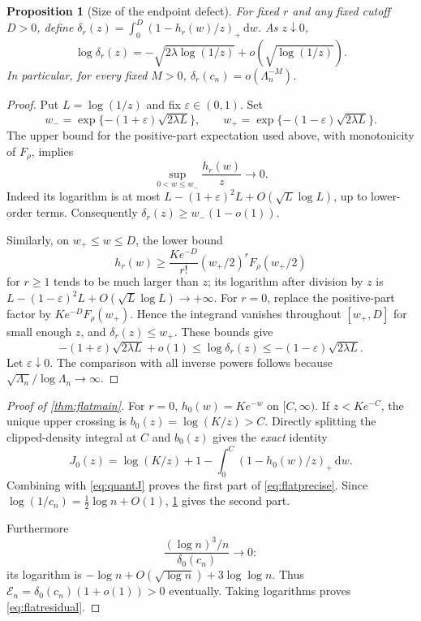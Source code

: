 \documentclass[11pt,oneside]{article}
\numberwithin{equation}{section}
\theoremstyle{plain}
\newtheorem{proposition}[theorem]{Proposition}
\theoremstyle{definition}
\theoremstyle{remark}
\newcommand{\dd}{\,\mathrm d}
\newcommand{\eps}{\varepsilon}
\begin{document}
\begin{proposition}[Size of the endpoint defect]\label{prop:defect}
For fixed $r$ and any fixed cutoff $D>0$, define
$\delta_r(z)=\int_0^D(1-h_r(w)/z)_+\dd w$. As $z\downarrow0$,
\begin{equation}\label{eq:deltasize}
 \log\delta_r(z)=-\sqrt{2\lambda\log(1/z)}
                    +o\!\left(\sqrt{\log(1/z)}\right).
\end{equation}
In particular, for every fixed $M>0$,
$\delta_r(c_n)=o(\Lambda_n^{-M})$.
\end{proposition}
\begin{proof}
Put $L=\log(1/z)$ and fix $\eps\in(0,1)$. Set
\[
 w_-=\exp\{-(1+\eps)\sqrt{2\lambda L}\},\qquad
 w_+=\exp\{-(1-\eps)\sqrt{2\lambda L}\}.
\]
The upper bound for the positive-part expectation used above,
with monotonicity of $F_\rho$, implies
\[
 \sup_{0<w\le w_-}\frac{h_r(w)}z\longrightarrow0.
\]
Indeed its logarithm is at most
$L-(1+\eps)^2L+O(\sqrt L\log L)$, up to lower-order terms.
Consequently $\delta_r(z)\ge w_-(1-o(1))$.

Similarly, on $w_+\le w\le D$, the lower bound
\[
 h_r(w)\ge\frac{K e^{-D}}{r!}(w_+/2)^rF_\rho(w_+/2)
\]
for $r\ge1$ tends to be much larger than $z$; its logarithm after
division by $z$ is
$L-(1-\eps)^2L+O(\sqrt L\log L)\to+\infty$.
For $r=0$, replace the positive-part factor by
$K e^{-D}F_\rho(w_+)$. Hence the integrand vanishes throughout
$[w_+,D]$ for small enough $z$, and $\delta_r(z)\le w_+$.
These bounds give
\[
 -(1+\eps)\sqrt{2\lambda L}+o(1)
 \le\log\delta_r(z)
 \le-(1-\eps)\sqrt{2\lambda L}.
\]
Let $\eps\downarrow0$. The comparison with all inverse powers
follows because $\sqrt{\Lambda_n}/\log\Lambda_n\to\infty$.
\end{proof}

\begin{proof}[Proof of \cref{thm:flatmain}]
For $r=0$, $h_0(w)=K e^{-w}$ on $[C,\infty)$. If
$z<K e^{-C}$, the unique upper crossing is
$b_0(z)=\log(K/z)>C$. Directly splitting the clipped-density
integral at $C$ and $b_0(z)$ gives the \emph{exact} identity
\begin{equation}\label{eq:J0exact}
 J_0(z)=\log(K/z)+1-\int_0^C(1-h_0(w)/z)_+\dd w.
\end{equation}
Combining with \eqref{eq:quantJ} proves the first part of
\eqref{eq:flatprecise}. Since
$\log(1/c_n)=\tfrac12\log n+O(1)$, \cref{prop:defect} gives the
second part.

Furthermore
\[
 \frac{(\log n)^3/n}{\delta_0(c_n)}\longrightarrow0:
\]
its logarithm is $-\log n+O(\sqrt{\log n})+3\log\log n$.
Thus $\mathcal E_n=\delta_0(c_n)(1+o(1))>0$ eventually. Taking
logarithms proves \eqref{eq:flatresidual}.
\end{proof}
\end{document}
